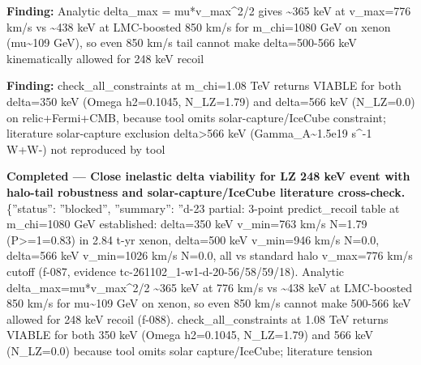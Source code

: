 \documentclass[11pt,a4paper]{article}
\begin{document}
\textbf{Finding:} Analytic delta\_max = mu*v\_max\textasciicircum{}2/2 gives \textasciitilde{}365 keV at v\_max=776 km/s vs \textasciitilde{}438 keV at LMC-boosted 850 km/s for m\_chi=1080 GeV on xenon (mu\textasciitilde{}109 GeV), so even 850 km/s tail cannot make delta=500-566 keV kinematically allowed for 248 keV recoil

\textbf{Finding:} check\_all\_constraints at m\_chi=1.08 TeV returns VIABLE for both delta=350 keV (Omega h2=0.1045, N\_LZ=1.79) and delta=566 keV (N\_LZ=0.0) on relic+Fermi+CMB, because tool omits solar-capture/IceCube constraint; literature solar-capture exclusion delta\textgreater{}566 keV (Gamma\_A\textasciitilde{}1.5e19 s\textasciicircum{}-1 W+W-) not reproduced by tool

\textbf{Completed --- Close inelastic delta viability for LZ 248 keV event with halo-tail robustness and solar-capture/IceCube literature cross-check.} \{''status'': ''blocked'', ''summary'': ''d-23 partial: 3-point predict\_recoil table at m\_chi=1080 GeV established: delta=350 keV v\_min=763 km/s N=1.79 (P\textgreater{}=1=0.83) in 2.84 t-yr xenon, delta=500 keV v\_min=946 km/s N=0.0, delta=566 keV v\_min=1026 km/s N=0.0, all vs standard halo v\_max=776 km/s cutoff (f-087, evidence tc-261102\_1-w1-d-20-56/58/59/18). Analytic delta\_max=mu*v\_max\textasciicircum{}2/2 \textasciitilde{}365 keV at 776 km/s vs \textasciitilde{}438 keV at LMC-boosted 850 km/s for mu\textasciitilde{}109 GeV on xenon, so even 850 km/s cannot make 500-566 keV allowed for 248 keV recoil (f-088). check\_all\_constraints at 1.08 TeV returns VIABLE for both 350 keV (Omega h2=0.1045, N\_LZ=1.79) and 566 keV (N\_LZ=0.0) because tool omits solar capture/IceCube; literature tension
\end{document}
